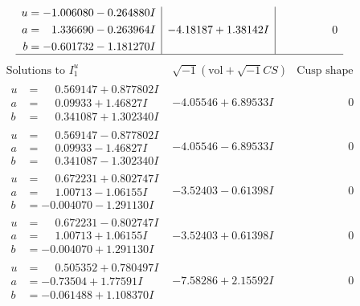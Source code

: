 \documentclass[1p]{elsarticle_modified}
\theoremstyle{definition}
\newcommand{\I}{\sqrt{-1}}
\begin{document}
$$\begin{array}{c|c|c}
\begin{aligned}
u &= -1.006080 - 0.264880 I \\
a &= \phantom{-}1.336690 - 0.263964 I \\
b &= -0.601732 - 1.181270 I\end{aligned}
 & -4.18187 + 1.38142 I & \phantom{-0.000000 } 0\\
 \hline 
 \end{array}$$\newpage$$\begin{array}{c|c|c}  
\text{Solutions to }I^u_{1}& \I (\text{vol} + \sqrt{-1}CS) & \text{Cusp shape}\\
 \hline 
\begin{aligned}
u &= \phantom{-}0.569147 + 0.877802 I \\
a &= \phantom{-}0.09933 + 1.46827 I \\
b &= \phantom{-}0.341087 + 1.302340 I\end{aligned}
 & -4.05546 + 6.89533 I & \phantom{-0.000000 } 0 \\ \hline\begin{aligned}
u &= \phantom{-}0.569147 - 0.877802 I \\
a &= \phantom{-}0.09933 - 1.46827 I \\
b &= \phantom{-}0.341087 - 1.302340 I\end{aligned}
 & -4.05546 - 6.89533 I & \phantom{-0.000000 } 0 \\ \hline\begin{aligned}
u &= \phantom{-}0.672231 + 0.802747 I \\
a &= \phantom{-}1.00713 - 1.06155 I \\
b &= -0.004070 - 1.291130 I\end{aligned}
 & -3.52403 - 0.61398 I & \phantom{-0.000000 } 0 \\ \hline\begin{aligned}
u &= \phantom{-}0.672231 - 0.802747 I \\
a &= \phantom{-}1.00713 + 1.06155 I \\
b &= -0.004070 + 1.291130 I\end{aligned}
 & -3.52403 + 0.61398 I & \phantom{-0.000000 } 0 \\ \hline\begin{aligned}
u &= \phantom{-}0.505352 + 0.780497 I \\
a &= -0.73504 + 1.77591 I \\
b &= -0.061488 + 1.108370 I\end{aligned}
 & -7.58286 + 2.15592 I & \phantom{-0.000000 } 0 \\ \hline\begin{aligned}

\end{aligned}
\end{array}$$
\end{document}
